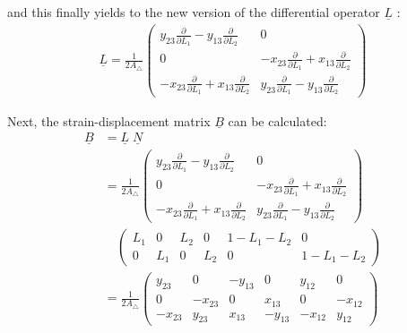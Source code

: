   and this finally yields to the new version of the differential operator $\underline{L}$ \cite{steinke2005finite}:
  \begin{align}
  \underline{L} = \frac{1}{2 A_\triangle} \begin{pmatrix}
  y_{23}\frac{\partial}{\partial L_1} - y_{13}\frac{\partial}{\partial L_2} & 0 \\
  0 & -x_{23}\frac{\partial}{\partial L_1} + x_{13}\frac{\partial}{\partial L_2} \\
  -x_{23}\frac{\partial}{\partial L_1} + x_{13}\frac{\partial}{\partial L_2} & y_{23}\frac{\partial}{\partial L_1} - y_{13}\frac{\partial}{\partial L_2}
  \end{pmatrix}
  \end{align}
  
  Next, the strain-displacement matrix $\underline{B}$ can be calculated:
  \begin{align}
  \underline{B} &= \underline{L}\; \underline{N} \nonumber\\
  &= \frac{1}{2 A_\triangle} \begin{pmatrix}
  y_{23}\frac{\partial}{\partial L_1} - y_{13}\frac{\partial}{\partial L_2} & 0 \\
  0 & -x_{23}\frac{\partial}{\partial L_1} + x_{13}\frac{\partial}{\partial L_2} \\
  -x_{23}\frac{\partial}{\partial L_1} + x_{13}\frac{\partial}{\partial L_2} & y_{23}\frac{\partial}{\partial L_1} - y_{13}\frac{\partial}{\partial L_2}
  \end{pmatrix} \nonumber\\
  & \quad \begin{pmatrix}
  L_1 & 0 & L_2 & 0 & 1-L_1-L_2 & 0 \\
  0 & L_1 & 0 & L_2 & 0 & 1-L_1-L_2
  \end{pmatrix} \nonumber\\
  &= \frac{1}{2 A_\triangle} \begin{pmatrix}
  y_{23} & 0 & -y_{13} & 0 & y_{12} & 0 \\
  0 & -x_{23} & 0 & x_{13} & 0 & -x_{12} \\
  -x_{23} & y_{23} & x_{13} & -y_{13} & -x_{12} & y_{12}
  \end{pmatrix}
  \end{align}
  
